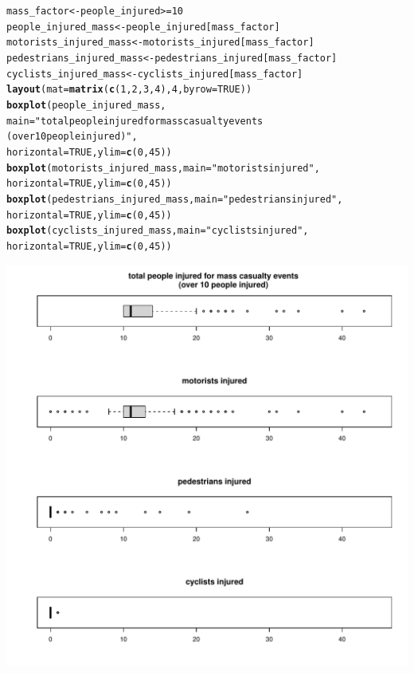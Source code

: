 \documentclass[10pt]{article}\usepackage[]{graphicx}\usepackage[]{xcolor}
\makeatletter
\def\maxwidth{ %
  \ifdim\Gin@nat@width>\linewidth
    \linewidth
  \else
    \Gin@nat@width
  \fi
}
\newcommand{\hlnum}[1]{\textcolor[rgb]{0.686,0.059,0.569}{#1}}%
\newcommand{\hlsng}[1]{\textcolor[rgb]{0.192,0.494,0.8}{#1}}%
\newcommand{\hlopt}[1]{\textcolor[rgb]{0,0,0}{#1}}%
\newcommand{\hldef}[1]{\textcolor[rgb]{0.345,0.345,0.345}{#1}}%
\newcommand{\hlkwb}[1]{\textcolor[rgb]{0.69,0.353,0.396}{#1}}%
\newcommand{\hlkwc}[1]{\textcolor[rgb]{0.333,0.667,0.333}{#1}}%
\newcommand{\hlkwd}[1]{\textcolor[rgb]{0.737,0.353,0.396}{\textbf{#1}}}%
\newenvironment{kframe}{%
 \def\at@end@of@kframe{}%
 \ifinner\ifhmode%
  \def\at@end@of@kframe{\end{minipage}}%
  \begin{minipage}{\columnwidth}%
 \fi\fi%
 \def\FrameCommand##1{\hskip\@totalleftmargin \hskip-\fboxsep
 \colorbox{shadecolor}{##1}\hskip-\fboxsep
     \hskip-\linewidth \hskip-\@totalleftmargin \hskip\columnwidth}%
 \MakeFramed {\advance\hsize-\width
   \@totalleftmargin\z@ \linewidth\hsize
   \@setminipage}}%
 {\par\unskip\endMakeFramed%
 \at@end@of@kframe}
\newenvironment{knitrout}{}{} %
\makeatother
\begin{document}
\begin{knitrout}
\begin{kframe}
\begin{alltt}
\hldef{mass_factor} \hlkwb{<-} \hldef{people_injured} \hlopt{>=} \hlnum{10}
\hldef{people_injured_mass} \hlkwb{<-} \hldef{people_injured[mass_factor]}
\hldef{motorists_injured_mass} \hlkwb{<-} \hldef{motorists_injured[mass_factor]}
\hldef{pedestrians_injured_mass} \hlkwb{<-} \hldef{pedestrians_injured[mass_factor]}
\hldef{cyclists_injured_mass} \hlkwb{<-} \hldef{cyclists_injured[mass_factor]}
\hlkwd{layout}\hldef{(}\hlkwc{mat} \hldef{=} \hlkwd{matrix}\hldef{(}\hlkwd{c}\hldef{(}\hlnum{1}\hldef{,} \hlnum{2}\hldef{,} \hlnum{3}\hldef{,} \hlnum{4}\hldef{),} \hlnum{4}\hldef{,} \hlkwc{byrow} \hldef{=} \hlnum{TRUE}\hldef{))}
\hlkwd{boxplot}\hldef{(people_injured_mass,}
        \hlkwc{main}\hldef{=}\hlsng{"total people injured for mass casualty events 
        (over 10 people injured)"}\hldef{,}
        \hlkwc{horizontal}\hldef{=}\hlnum{TRUE}\hldef{,} \hlkwc{ylim} \hldef{=} \hlkwd{c}\hldef{(}\hlnum{0}\hldef{,} \hlnum{45}\hldef{))}
\hlkwd{boxplot}\hldef{(motorists_injured_mass,} \hlkwc{main}\hldef{=}\hlsng{"motorists injured"}\hldef{,}
        \hlkwc{horizontal}\hldef{=}\hlnum{TRUE}\hldef{,} \hlkwc{ylim} \hldef{=} \hlkwd{c}\hldef{(}\hlnum{0}\hldef{,} \hlnum{45}\hldef{))}
\hlkwd{boxplot}\hldef{(pedestrians_injured_mass,} \hlkwc{main}\hldef{=}\hlsng{"pedestrians injured"}\hldef{,}
        \hlkwc{horizontal}\hldef{=}\hlnum{TRUE}\hldef{,} \hlkwc{ylim} \hldef{=} \hlkwd{c}\hldef{(}\hlnum{0}\hldef{,} \hlnum{45}\hldef{))}
\hlkwd{boxplot}\hldef{(cyclists_injured_mass,} \hlkwc{main} \hldef{=} \hlsng{"cyclists injured"}\hldef{,}
        \hlkwc{horizontal}\hldef{=}\hlnum{TRUE}\hldef{,} \hlkwc{ylim} \hldef{=} \hlkwd{c}\hldef{(}\hlnum{0}\hldef{,} \hlnum{45}\hldef{))}
\end{alltt}
\end{kframe}
\includegraphics[width=\maxwidth]{figure/unnamed-chunk-6-1} 
\end{knitrout}
\end{document}
